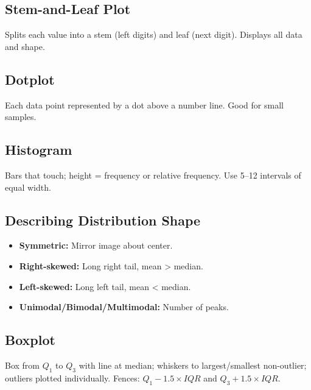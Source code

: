 \documentclass[11pt]{article}
\begin{document}
\subsection*{Stem-and-Leaf Plot}
Splits each value into a stem (left digits) and leaf (next digit). Displays all data and shape.

\subsection*{Dotplot}
Each data point represented by a dot above a number line. Good for small samples.

\subsection*{Histogram}
Bars that touch; height = frequency or relative frequency. Use 5–12 intervals of equal width.

\subsection*{Describing Distribution Shape}
\begin{itemize}[nosep]
    \item \textbf{Symmetric:} Mirror image about center.
    \item \textbf{Right-skewed:} Long right tail, mean > median.
    \item \textbf{Left-skewed:} Long left tail, mean < median.
    \item \textbf{Unimodal/Bimodal/Multimodal:} Number of peaks.
\end{itemize}

\subsection*{Boxplot}
Box from \(Q_1\) to \(Q_3\) with line at median; whiskers to largest/smallest non-outlier; outliers plotted individually. Fences: \(Q_1-1.5\times IQR\) and \(Q_3+1.5\times IQR\).

\begin{center}
\end{center}
\end{document}
